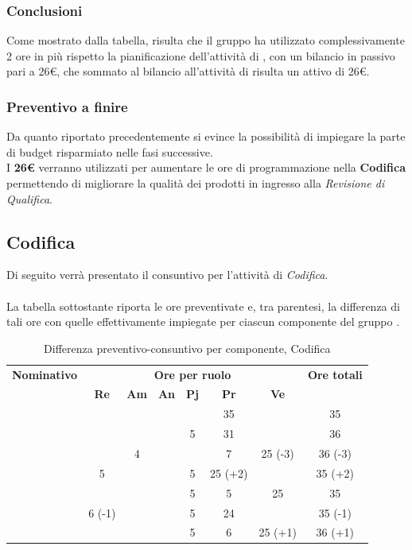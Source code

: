 \subsubsection{Conclusioni}
Come mostrato dalla tabella, risulta che il gruppo ha utilizzato complessivamente 2 ore in più rispetto la pianificazione dell'attività di \textit{\PD}, con un bilancio in passivo pari a 26€, che sommato al bilancio all'attività di \textit{\PA} risulta un attivo di 26€.

\subsubsection{Preventivo a finire}
Da quanto riportato precedentemente si evince la possibilità di impiegare la parte di budget risparmiato nelle fasi successive. \\
I \textbf{26€} verranno utilizzati per aumentare le ore di programmazione nella \textbf{Codifica} permettendo di migliorare la qualità dei prodotti in ingresso alla \textit{Revisione di Qualifica}.

\newpage
\subsection{Codifica}
Di seguito verrà presentato il consuntivo per l'attività di \textit{Codifica}.
\\\\
La tabella sottostante riporta le ore preventivate e, tra parentesi, la differenza di tali ore con quelle effettivamente impiegate per ciascun componente del gruppo \gruppo.


\begin{table}[H]
	\begin{center}
		\begin{tabular}{|c|c|c|c|c|c|c|c|}
			\hline
			\textbf{Nominativo} & \multicolumn{6}{c|}{\textbf{Ore per ruolo}} & \textbf{Ore totali} \\
			& \textbf{Re} & \textbf{Am} & \textbf{An} & \textbf{Pj} & \textbf{Pr} & \textbf{Ve} & \\
			\hline
			\FB			&			&			&			&		&	35			&			&	35		\\
			\hline
			\AF			&			&			&			&	5	&	31			&			& 	36		\\
			\hline		
			\GN			&			&	4		&			&		&	7			&	25 (-3)	&	36 (-3)	\\
			\hline
			\GR			&	5		&	 		&			&	5	&	25 (+2) 	& 			&	35 (+2)	\\
			\hline
			\SM 		&			&			&			&	5	&	5			& 	25		&	35		\\
			\hline
			\MP 		& 	6 (-1)	&			&			&	5	&	24			&			&	35 (-1)	\\
			\hline
			\MV 		&			&			&			&	5	&	6			&	25 (+1)	& 	36 (+1)\\
			\hline
		\end{tabular}
	\end{center}
	\caption{Differenza preventivo-consuntivo per componente, Codifica}
\end{table}


